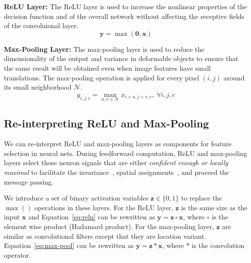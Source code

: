 \textbf{ReLU Layer:}
The ReLU layer is used to increase the nonlinear properties of the decision function and of the overall network without affecting the receptive fields of the convoluional layer.
\begin{equation}
\mathbf{y} = \max (\mathbf{0}, \mathbf{x})
\label{eq:relu}
\end{equation}

\textbf{Max-Pooling Layer:}
The max-pooling layer is used to reduce the dimensionality of the output and variance in deformable objects to ensure that the same result will be obtained even when image features have small translations. The max-pooling operation is applied for every pixel $(i,j)$ around its small neighborhood $\mathcal{N}$.
\begin{equation}
y_{i,j,c} = \max_{u,v \in \mathcal{N}} x_{i+u, j+v, c},\ \forall i, j, c
\label{eq:max-pool}
\end{equation}

\subsection{Re-interpreting ReLU and Max-Pooling}
We can re-interpret ReLU and max-pooling layers as components for feature selection in neural nets. During feedforward computation, ReLU and max-pooling layers select those neuron signals that are either \emph{confident enough or locally maximal} to facilitate the invariance~\cite{riesenhuber1999hierarchical}, spatial assignments~\cite{weng1992cresceptron}, and proceed the message passing.

We introduce a set of binary activation variables $\mathbf{z} \in \{0, 1\}$ to replace the $\max()$ operations in these layers. For the ReLU layer, $\mathbf{z}$ is the same size as the input $\mathbf{x}$ and Equation~\ref{eq:relu} can be rewritten as $\mathbf{y} = \mathbf{z} \circ \mathbf{x}$, where $\circ$ is the element wise product (Hadamard product). For the max-pooling layer, $\mathbf{z}$ are similar as convolutional filters except that they are location variant. Equation~\ref{eq:max-pool} can be rewritten as $\mathbf{y} = \mathbf{z} * \mathbf{x}$, where $*$ is the convolution operator.

